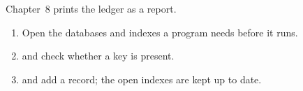 Chapter~8 prints the ledger as a report.

\begin{enumerate}
\item Open the databases and indexes a program needs before it runs.
\item {} and  check whether a key is present.
\item {} and  add a record; the open indexes are
  kept up to date.
\end{enumerate}
